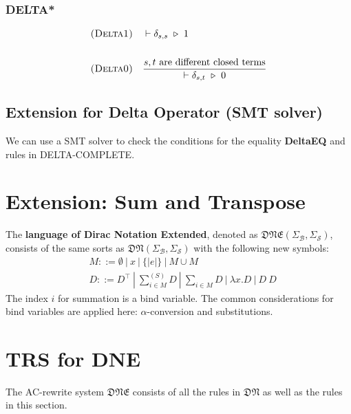 \subsubsection*{\textsf{DELTA*}}
\begin{align*}
  & \textsc{(Delta1)} && 
  \vdash \delta_{s, s} \ \triangleright\  1
  \\
  \\
  & \textsc{(Delta0)} &&
  \frac{s, t \text{ are different closed terms}}{\vdash \delta_{s, t} \ \triangleright\  0}
\end{align*}

\subsection{Extension for Delta Operator (SMT solver)}
We can use a SMT solver to check the conditions for the equality \textbf{DeltaEQ} and rules in \textsf{DELTA-COMPLETE}.


\section{Extension: Sum and Transpose}

\begin{definition}[DNE]
    The \textbf{language of Dirac Notation Extended}, denoted as $\mathfrak{DNE}(\Sigma_\mathcal{B}, \Sigma_\mathcal{S})$, consists of the same sorts as $\mathfrak{DN}(\Sigma_\mathcal{B}, \Sigma_\mathcal{S})$ with the following new symbols:
    \begin{align*}
        & M ::= \emptyset\ |\ x\ |\ \{| e |\}\ |\ M \cup M \\
        & D ::= D^\top\ |\ \sum^{(S)}_{i \in M} D\ |\ \sum_{i \in M} D\ |\ \lambda x.D\ |\ D\ D
    \end{align*}
    The index $i$ for summation is a bind variable. The common considerations for bind variables are applied here: $\alpha$-conversion and substitutions.
\end{definition}


\section{TRS for DNE}

\begin{definition}
    The AC-rewrite system $\mathfrak{DNE}$ consists of all the rules in $\mathfrak{DN}$ as well as the rules in this section.
\end{definition}

